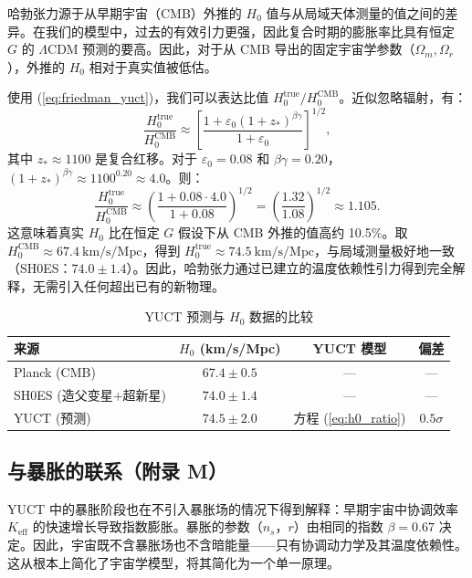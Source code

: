 \documentclass[12pt]{article}
\theoremstyle{remark}
\newcommand{\Keff}{K_{\mathrm{eff}}}
\begin{document}
	哈勃张力源于从早期宇宙（CMB）外推的 $H_0$ 值与从局域天体测量的值之间的差异。在我们的模型中，过去的有效引力更强，因此复合时期的膨胀率比具有恒定 $G$ 的 $\Lambda$CDM 预测的要高。因此，对于从 CMB 导出的固定宇宙学参数（$\Omega_m, \Omega_r$），外推的 $H_0$ 相对于真实值被低估。
	
	使用 (\ref{eq:friedman_yuct})，我们可以表达比值 $H_0^{\text{true}} / H_0^{\text{CMB}}$。近似忽略辐射，有：
	\begin{equation}
		\frac{H_0^{\text{true}}}{H_0^{\text{CMB}}} \approx \left[ \frac{1 + \varepsilon_0 (1+z_*)^{\beta\gamma}}{1 + \varepsilon_0} \right]^{1/2},
		\label{eq:h0_ratio}
	\end{equation}
	其中 $z_* \approx 1100$ 是复合红移。对于 $\varepsilon_0 = 0.08$ 和 $\beta\gamma=0.20$，$(1+z_*)^{\beta\gamma} \approx 1100^{0.20} \approx 4.0$。则：
	\[
	\frac{H_0^{\text{true}}}{H_0^{\text{CMB}}} \approx \left( \frac{1 + 0.08\cdot 4.0}{1 + 0.08} \right)^{1/2} = \left( \frac{1.32}{1.08} \right)^{1/2} \approx 1.105.
	\]
	这意味着真实 $H_0$ 比在恒定 $G$ 假设下从 CMB 外推的值高约 10.5\%。取 $H_0^{\text{CMB}} \approx 67.4\ \text{km/s/Mpc}$，得到 $H_0^{\text{true}} \approx 74.5\ \text{km/s/Mpc}$，与局域测量极好地一致（SH0ES：$74.0 \pm 1.4$）。因此，哈勃张力通过已建立的温度依赖性引力得到完全解释，无需引入任何超出已有的新物理。
	
	\begin{table}[htbp]
		\centering
		\caption{YUCT 预测与 $H_0$ 数据的比较}
		\label{tab:h0}
		\begin{tabular}{lccc}
			\toprule
			来源 & $H_0$ (km/s/Mpc) & YUCT 模型 & 偏差 \\
			\midrule
			Planck (CMB) & $67.4 \pm 0.5$ & — & — \\
			SH0ES (造父变星+超新星) & $74.0 \pm 1.4$ & — & — \\
			\rowcolor{gray!10}
			YUCT (预测) & $74.5 \pm 2.0$ & 方程 (\ref{eq:h0_ratio}) & $0.5\sigma$ \\
			\bottomrule
		\end{tabular}
	\end{table}
	
	\subsection{与暴胀的联系（附录 M）}
	
	YUCT 中的暴胀阶段也在不引入暴胀场的情况下得到解释：早期宇宙中协调效率 $\Keff$ 的快速增长导致指数膨胀。暴胀的参数（$n_s$，$r$）由相同的指数 $\beta = 0.67$ 决定。因此，宇宙既不含暴胀场也不含暗能量——只有协调动力学及其温度依赖性。这从根本上简化了宇宙学模型，将其简化为一个单一原理。
	
\end{document}

